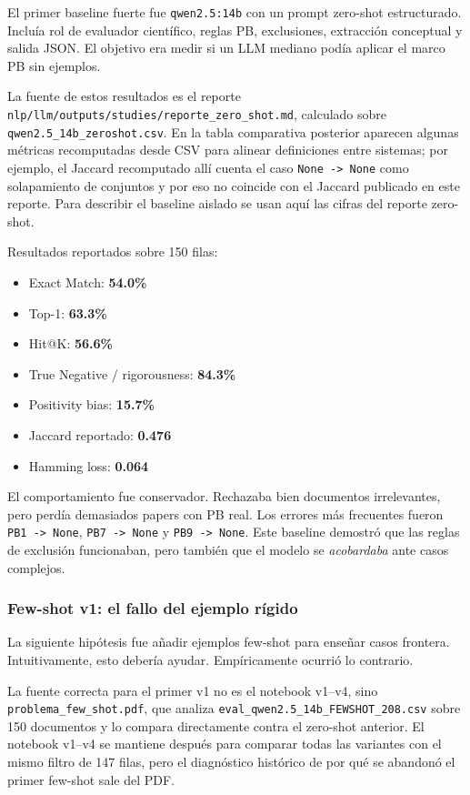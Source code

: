 El primer baseline fuerte fue \texttt{qwen2.5:14b} con un prompt zero-shot estructurado. Incluía rol de evaluador científico, reglas PB, exclusiones, extracción conceptual y salida JSON. El objetivo era medir si un LLM mediano podía aplicar el marco PB sin ejemplos.

La fuente de estos resultados es el reporte \texttt{nlp/llm/outputs/studies/reporte\_zero\_shot.md}, calculado sobre \texttt{qwen2.5\_14b\_zeroshot.csv}. En la tabla comparativa posterior aparecen algunas métricas recomputadas desde CSV para alinear definiciones entre sistemas; por ejemplo, el Jaccard recomputado allí cuenta el caso \texttt{None -> None} como solapamiento de conjuntos y por eso no coincide con el Jaccard publicado en este reporte. Para describir el baseline aislado se usan aquí las cifras del reporte zero-shot.

Resultados reportados sobre 150 filas:

\begin{itemize}
\item Exact Match: \textbf{54.0\%}
\item Top-1: \textbf{63.3\%}
\item Hit@K: \textbf{56.6\%}
\item True Negative / rigorousness: \textbf{84.3\%}
\item Positivity bias: \textbf{15.7\%}
\item Jaccard reportado: \textbf{0.476}
\item Hamming loss: \textbf{0.064}
\end{itemize}

El comportamiento fue conservador. Rechazaba bien documentos irrelevantes, pero perdía demasiados papers con PB real. Los errores más frecuentes fueron \texttt{PB1 -> None}, \texttt{PB7 -> None} y \texttt{PB9 -> None}. Este baseline demostró que las reglas de exclusión funcionaban, pero también que el modelo se \emph{acobardaba} ante casos complejos.

\subsubsection{Few-shot v1: el fallo del ejemplo rígido}

La siguiente hipótesis fue añadir ejemplos few-shot para enseñar casos frontera. Intuitivamente, esto debería ayudar. Empíricamente ocurrió lo contrario.

La fuente correcta para el primer v1 no es el notebook v1--v4, sino \texttt{problema\_few\_shot.pdf}, que analiza \texttt{eval\_qwen2.5\_14b\_FEWSHOT\_208.csv} sobre 150 documentos y lo compara directamente contra el zero-shot anterior. El notebook v1--v4 se mantiene después para comparar todas las variantes con el mismo filtro de 147 filas, pero el diagnóstico histórico de por qué se abandonó el primer few-shot sale del PDF.

